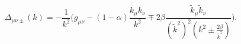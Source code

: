 \begin{equation}  
\Delta_{\mu\nu\pm}(k) =-\frac1{k^2}\Big(g_{\mu\nu}-(1-\alpha)
\frac{k_\mu k_\nu}{k^2}
\mp2\beta\frac{\tilde k_\mu\tilde k_\nu}{(\tilde k^2)^2(k^2\pm\frac{2\beta}
{\tilde k^2})}\Big).
\end{equation}

